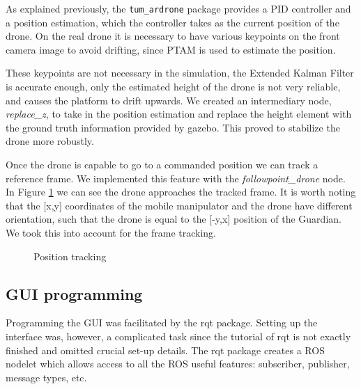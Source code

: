 \documentclass[11pt,a4paper]{article}
\begin{document}
As explained previously, the \verb!tum_ardrone! package provides a PID controller and a position estimation, which the controller takes as the current position of the drone. On the real drone it is necessary to have various keypoints on the front camera image to avoid drifting, since PTAM is used to estimate the position.

These keypoints are not necessary in the simulation, the Extended Kalman Filter is accurate enough, only the estimated height of the drone is not very reliable, and causes the platform to drift upwards. We created an intermediary node, \textit{replace\_z}, to take in the position estimation and replace the height element with the ground truth information provided by gazebo. This proved to stabilize the drone more robustly.

Once the drone is capable to go to a commanded position we can track a reference frame. We implemented this feature with the \textit{followpoint\_drone} node. In Figure \ref{fig:posT} we can see the drone approaches the tracked frame. It is worth noting that the [x,y] coordinates of the mobile manipulator and the drone have different orientation, such that the drone is equal to the [-y,x] position of the Guardian. We took this into account for the frame tracking.

\begin{figure}[ht!]%
	\centering
    \qquad  
    \caption{Position tracking}
    \label{fig:posT}
\end{figure}




\subsection{GUI programming}
Programming the GUI was facilitated by the rqt package. Setting up the interface was, however,
 a complicated task since the tutorial of rqt is not exactly finished and omitted crucial set-up details. The rqt package creates a ROS nodelet which allows access to
all the ROS useful features: subscriber, publisher, message types, etc.
\end{document}
